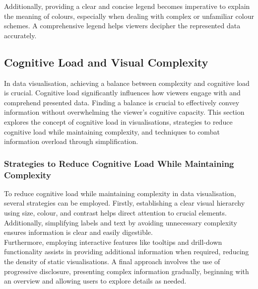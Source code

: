 \documentclass{article}\usepackage[]{graphicx}\usepackage[]{xcolor}
\numberwithin{equation}{section}
\begin{document}
\noindent 
Additionally, providing a clear and concise legend becomes imperative to explain the meaning of colours, especially when dealing with complex or unfamiliar colour schemes. A comprehensive legend helps viewers decipher the represented data accurately.\\


\subsection{Cognitive Load and Visual Complexity}
In data visualisation, achieving a balance between complexity and cognitive load is crucial. Cognitive load significantly influences how viewers engage with and comprehend presented data. Finding a balance is crucial to effectively convey information without overwhelming the viewer's cognitive capacity. This section explores the concept of cognitive load in visualisations, strategies to reduce cognitive load while maintaining complexity, and techniques to combat information overload through simplification.

\subsubsection{Strategies to Reduce Cognitive Load While Maintaining Complexity}
To reduce cognitive load while maintaining complexity in data visualisation, several strategies can be employed. Firstly, establishing a clear visual hierarchy using size, colour, and contrast helps direct attention to crucial elements. Additionally, simplifying labels and text by avoiding unnecessary complexity ensures information is clear and easily digestible.\\

\noindent Furthermore, employing interactive features like tooltips and drill-down functionality assists in providing additional information when required, reducing the density of static visualisations. A final approach involves the use of progressive disclosure, presenting complex information gradually, beginning with an overview and allowing users to explore details as needed.\\
\end{document}

